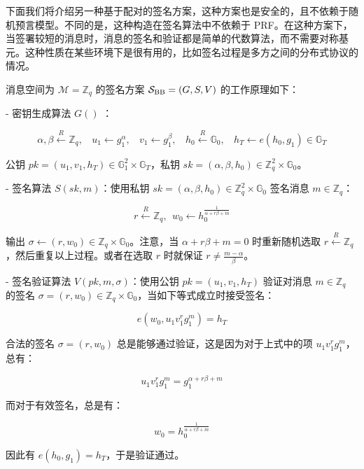 下面我们将介绍另一种基于配对的签名方案，这种方案也是安全的，且不依赖于随机预言模型。不同的是，这种构造在签名算法中不依赖于 PRF。在这种方案下，当签署较短的消息时，消息的签名和验证都是简单的代数算法，而不需要对称基元。这种性质在某些环境下是很有用的，比如签名过程是多方之间的分布式协议的情况。

消息空间为 $\mathcal{M}=\mathbb{Z}_q$ 的签名方案 $\mathcal{S}_{\rm BB}=(G,S,V)$ 的工作原理如下：

- 密钥生成算法 $G()$ ：
    
    $$
    \alpha,\beta\overset{R}\leftarrow\mathbb{Z}_q,~~~~
    u_1\leftarrow g_1^\alpha,~~~~
    v_1\leftarrow g_1^\beta,~~~~
    h_0\overset{R}\leftarrow \mathbb{G}_0,~~~~
    h_T\leftarrow e(h_0,g_1)\in\mathbb{G}_T
    $$
    
    公钥 $pk=(u_1,v_1, h_T)\in\mathbb{G}_1^2\times\mathbb{G}_T$，私钥 $sk=(\alpha,\beta,h_0)\in\mathbb{Z}_q^2\times\mathbb{G}_0$。
    
- 签名算法 $S(sk,m)$：使用私钥 $sk=(\alpha,\beta,h_0)\in\mathbb{Z}_q^2\times\mathbb{G}_0$ 签名消息 $m\in\mathbb{Z}_q$：
    
    $$
    r\overset{R}\leftarrow \mathbb{Z}_q,~~
    w_0\leftarrow h_0^{\frac{1}{\alpha+r\beta+m}}
    $$
    
    输出 $\sigma \leftarrow (r,w_0)\in\mathbb{Z}_q\times\mathbb{G}_0$。注意，当 $\alpha+r\beta+m=0$ 时重新随机选取 $r\overset{R}\leftarrow \mathbb{Z}_q$，然后重复以上过程。或者在选取 $r$ 时就保证 $r\neq\frac{m-\alpha}{\beta}$。
    
- 签名验证算法 $V(pk,m,\sigma)$：使用公钥 $pk=(u_1,v_1,h_T)$ 验证对消息 $m\in\mathbb{Z}_q$ 的签名 $\sigma=(r,w_0)\in\mathbb{Z}_q\times\mathbb{G}_0$，当如下等式成立时接受签名：
    
    $$
    e(w_0,u_1v_1^rg_1^m)=h_T
    $$
    

合法的签名 $\sigma=(r,w_0)$ 总是能够通过验证，这是因为对于上式中的项 $u_1v_1^rg_1^m$，总有：

$$
u_1v_1^rg_1^m=g_1^{\alpha+r\beta+m}
$$

而对于有效签名，总是有：

$$
w_0=h_0^{\frac{1}{\alpha+r\beta+m}}
$$

因此有 $e(h_0,g_1)=h_T$，于是验证通过。